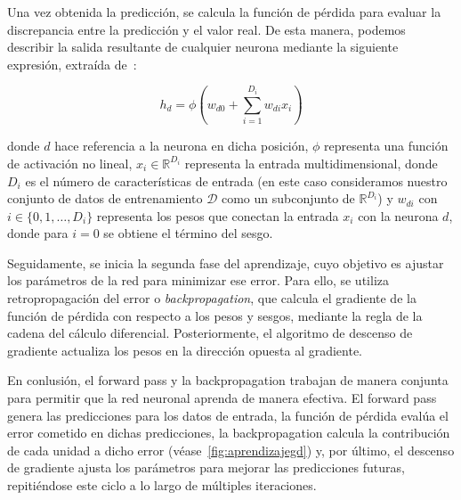 Una vez obtenida la predicción, se calcula la función de pérdida para evaluar la discrepancia entre la predicción y el valor real. De esta manera, podemos describir la salida resultante de cualquier neurona mediante la siguiente expresión, extraída de~\cite{Prince2023}:

\begin{equation}
    h_d = \phi \left( w_{d0} + \sum_{i=1}^{D_i} w_{di} x_i \right)
    \label{eq:hidden_unit}
\end{equation}

donde $d$ hace referencia a la neurona en dicha posición, $\phi$ representa una función de activación no lineal, $x_i \in \mathbb{R}^{D_i}$ representa la entrada multidimensional, donde $D_i$ es el número de características de entrada (en este caso consideramos nuestro conjunto de datos de entrenamiento $\mathcal{D}$ como un subconjunto de $\mathbb{R}^{D_i}$) y $w_{di}$ con $i \in \{0,1,\ldots,D_i\}$ representa los pesos que conectan la entrada $x_i$ con la neurona $d$, donde para $i = 0$ se obtiene el término del sesgo.\newline

Seguidamente, se inicia la segunda fase del aprendizaje, cuyo objetivo es ajustar los parámetros de la red para minimizar ese error. Para ello, se utiliza retropropagación del error o \emph{backpropagation}, que calcula el gradiente de la función de pérdida con respecto a los pesos y sesgos, mediante la regla de la cadena del cálculo diferencial. Posteriormente, el algoritmo de descenso de gradiente actualiza los pesos en la dirección opuesta al gradiente.\newline

En conlusión, el forward pass y la backpropagation trabajan de manera conjunta para permitir que la red neuronal aprenda de manera efectiva. El forward pass genera las predicciones para los datos de entrada, la función de pérdida evalúa el error cometido en dichas predicciones, la backpropagation calcula la contribución de cada unidad a dicho error (véase~\autoref{fig:aprendizajegd}) y, por último, el descenso de gradiente ajusta los parámetros para mejorar las predicciones futuras, repitiéndose este ciclo a lo largo de múltiples iteraciones.\newline

